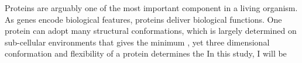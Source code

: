Proteins are arguably one of the most important component in a living organism. As genes encode biological features, proteins deliver biological functions. One protein can adopt many structural conformations, which is largely determined on sub-cellular environments that gives the minimum , yet three dimensional conformation and flexibility of a protein determines the     In this study, I will be 